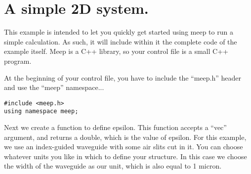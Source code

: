 \begin{comment}
/*
\end{comment}
\section{A simple 2D system.}
\begin{comment}
*/
\end{comment}

This example is intended to let you quickly get started using meep to run
a simple calculation.  As such, it will include within it the complete code
of the example itself.  Meep is a C++ library, so your control file is a
small C++ program.

At the beginning of your control file, you have to include the ``meep.h''
header and use the ``meep'' namespace...
\begin{verbatim}
#include <meep.h>
using namespace meep;
\end{verbatim}

Next we create a function to define epsilon.  This function accepts a
``vec'' argument, and returns a double, which is the value of epsilon.  For
this example, we use an index-guided waveguide with some air slits cut in
it.  You can choose whatever units you like in which to define your
structure.  In this case we choose the width of the waveguide as our unit,
which is also equal to 1 micron.

